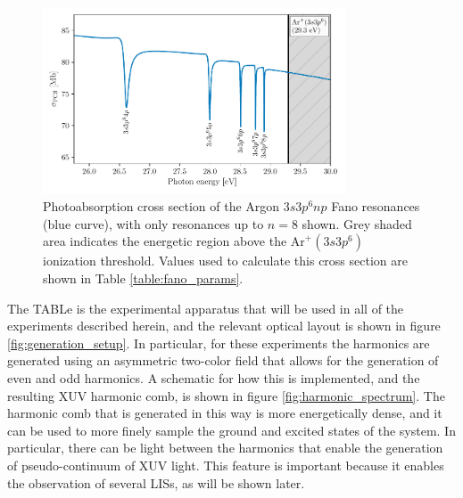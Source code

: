 \begin{figure}
	\centering
	\includegraphics[width=0.8\textwidth]{figures/ATS/fano_GS.pdf}
	\caption[Photoabsorption cross section of the Argon $3s3p^6np$ Fano resonances]{Photoabsorption cross section of the Argon $3s3p^6np$ Fano resonances (blue curve), with only resonances up to $n=8$ shown.  Grey shaded area indicates the energetic region above the $\mathrm{Ar}^+(3s3p^6)$ ionization threshold. Values used to calculate this cross section are shown in Table \ref{table:fano_params}.}
	\label{fig:fano_gs_pcs}
\end{figure}

The TABLe is the experimental apparatus that will be used in all of the experiments described herein, and the relevant optical layout is shown in figure \ref{fig:generation_setup}.  In particular, for these experiments the harmonics are generated using an asymmetric two-color field that allows for the generation of even and odd harmonics. A schematic for how this is implemented, and the resulting XUV harmonic comb, is shown in figure \ref{fig:harmonic_spectrum}.  The harmonic comb that is generated in this way is more energetically dense, and it can be used to more finely sample the ground and excited states of the system.  In particular, there can be light between the harmonics that enable the generation of pseudo-continuum of XUV light.  This feature is important because it enables the observation of several LISs, as will be shown later.

